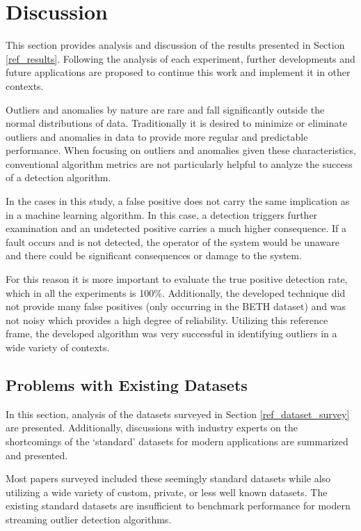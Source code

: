 \section{Discussion}
\label{sec:discussion}
This section provides analysis and discussion of the results presented in Section \ref{ref_results}. Following the analysis of each experiment, further developments and future applications are proposed to continue this work and implement it in other contexts.

Outliers and anomalies by nature are rare and fall significantly outside the normal distributions of data. Traditionally it is desired to minimize or eliminate outliers and anomalies in data to provide more regular and predictable performance. When focusing on outliers and anomalies given these characteristics, conventional algorithm metrics are not particularly helpful to analyze the success of a detection algorithm.

In the cases in this study, a false positive does not carry the same implication as in a machine learning algorithm. In this case, a detection triggers further examination and an undetected positive carries a much higher consequence. If a fault occurs and is not detected, the operator of the system would be unaware and there could be significant consequences or damage to the system.

For this reason it is more important to evaluate the true positive detection rate, which in all the experiments is 100\%. Additionally, the developed technique did not provide many false positives (only occurring in the BETH dataset) and was not noisy which provides a high degree of reliability. Utilizing this reference frame, the developed algorithm was very successful in identifying outliers in a wide variety of contexts.

\subsection{Problems with Existing Datasets}

In this section, analysis of the datasets surveyed in Section \ref{ref_dataset_survey} are presented. Additionally, discussions with industry experts on the shortcomings of the `standard' datasets for modern applications are summarized and presented.

Most papers surveyed included these seemingly standard datasets while also utilizing a wide variety of custom, private, or less well known datasets. The existing standard datasets are insufficient to benchmark performance for modern streaming outlier detection algorithms.

